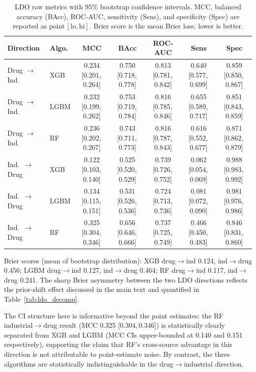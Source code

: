 \begin{table}[ht]
\caption{LDO raw metrics with 95\% bootstrap confidence intervals. MCC, balanced accuracy 
(BAcc), ROC-AUC, sensitivity (Sens), and specificity (Spec) are reported as 
$\mathrm{point}\,[\mathrm{lo},\mathrm{hi}]$. Brier score is the mean Brier loss; lower is 
better.}
\label{tab:ldo_raw}
\centering
\scriptsize
\setlength{\tabcolsep}{3pt}
\begin{tabular}{@{}llccccc@{}}
\toprule
Direction & Algo. & MCC & BAcc & ROC-AUC & Sens & Spec \\
\midrule
Drug $\to$ Ind.\ & XGB  & 0.234 [0.201,\,0.264] & 0.750 [0.718,\,0.778] & 0.813 [0.781,\,0.842] & 0.640 [0.577,\,0.699] & 0.859 [0.850,\,0.867] \\
Drug $\to$ Ind.\ & LGBM & 0.232 [0.199,\,0.262] & 0.753 [0.719,\,0.784] & 0.816 [0.785,\,0.846] & 0.655 [0.589,\,0.717] & 0.851 [0.843,\,0.859] \\
Drug $\to$ Ind.\ & RF   & 0.236 [0.202,\,0.267] & 0.743 [0.711,\,0.773] & 0.816 [0.787,\,0.843] & 0.616 [0.552,\,0.677] & 0.871 [0.862,\,0.879] \\
\midrule
Ind.\ $\to$ Drug & XGB  & 0.122 [0.103,\,0.140] & 0.525 [0.520,\,0.529] & 0.739 [0.726,\,0.752] & 0.062 [0.054,\,0.069] & 0.988 [0.983,\,0.992] \\
Ind.\ $\to$ Drug & LGBM & 0.134 [0.115,\,0.151] & 0.531 [0.526,\,0.536] & 0.724 [0.713,\,0.736] & 0.081 [0.072,\,0.090] & 0.981 [0.976,\,0.986] \\
Ind.\ $\to$ Drug & RF   & 0.325 [0.304,\,0.346] & 0.656 [0.646,\,0.666] & 0.737 [0.725,\,0.749] & 0.466 [0.450,\,0.483] & 0.846 [0.831,\,0.860] \\
\bottomrule
\end{tabular}

\medskip
\footnotesize
Brier scores (mean of bootstrap distribution): XGB drug$\to$ind 0.124, ind$\to$drug 0.456; 
LGBM drug$\to$ind 0.127, ind$\to$drug 0.464; RF drug$\to$ind 0.117, ind$\to$drug 0.241. The 
sharp Brier asymmetry between the two LDO directions reflects the prior-shift effect 
discussed in the main text and quantified in Table~\ref{tab:ldo_decomp}.
\end{table}

The CI structure here is informative beyond the point estimates: the RF industrial$\to$drug 
result (MCC 0.325 [0.304,\,0.346]) is statistically clearly separated from XGB and LGBM 
(MCC CIs upper-bounded at 0.140 and 0.151 respectively), supporting the claim that RF's 
cross-source advantage in this direction is not attributable to point-estimate noise. By 
contrast, the three algorithms are statistically indistinguishable in the drug$\to$industrial 
direction.

